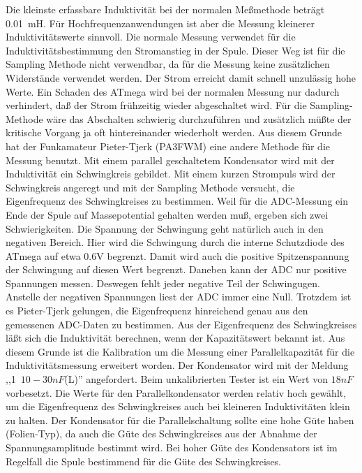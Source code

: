 Die kleinste erfassbare Induktivität bei der normalen Meßmethode beträgt 0.01~mH.
Für Hochfrequenzanwendungen ist aber die Messung kleinerer Induktivitätswerte sinnvoll.
Die normale Messung verwendet für die Induktivitätsbestimmung den Stromanstieg in der Spule.
Dieser Weg ist für die Sampling Methode nicht verwendbar, da für die Messung keine 
zusätzlichen Widerstände verwendet werden. Der Strom erreicht damit schnell unzulässig hohe
Werte. Ein Schaden des ATmega wird bei der normalen Messung nur dadurch verhindert, daß
der Strom frühzeitig wieder abgeschaltet wird. Für die Sampling-Methode wäre das Abschalten
schwierig durchzuführen und zusätzlich müßte der kritische Vorgang ja oft hintereinander wiederholt werden.
Aus diesem Grunde hat der Funkamateur Pieter-Tjerk (PA3FWM) eine andere Methode für die
Messung benutzt. Mit einem parallel geschaltetem Kondensator wird mit der Induktivität ein
Schwingkreis gebildet. Mit einem kurzen Strompuls wird der Schwingkreis angeregt und mit
der Sampling Methode versucht, die Eigenfrequenz des Schwingkreises zu bestimmen.
Weil für die ADC-Messung ein Ende der Spule auf Massepotential gehalten werden muß,
ergeben sich zwei Schwierigkeiten. Die Spannung der Schwingung geht natürlich auch
in den negativen Bereich. Hier wird die Schwingung durch die interne Schutzdiode
des ATmega auf etwa 0.6V begrenzt. Damit wird auch die positive Spitzenspannung der
Schwingung auf diesen Wert begrenzt. Daneben kann der ADC nur positive Spannungen messen.
Deswegen fehlt jeder negative Teil der Schwingugen. Anstelle der negativen Spannungen
liest der ADC immer eine Null.
Trotzdem ist es Pieter-Tjerk gelungen, die Eigenfrequenz hinreichend genau aus den
gemessenen ADC-Daten zu bestimmen. Aus der Eigenfrequenz des Schwingkreises läßt sich
die Induktivität berechnen, wenn der Kapazitätswert bekannt ist.
Aus diesem Grunde ist die Kalibration um die Messung einer Parallelkapazität für
die Induktivitätsmessung erweitert worden.
Der Kondensator wird mit der Meldung ,,\mbox{1  \(10-30nF\)(L)}''
angefordert. Beim unkalibrierten Tester ist ein Wert von \(18nF\) vorbesetzt.
Die Werte für den Parallelkondensator werden relativ hoch gewählt, um die Eigenfrequenz
des Schwingkreises auch bei kleineren Induktivitäten klein zu halten.
Der Kondensator für die Parallelschaltung sollte eine hohe Güte haben (Folien-Typ),
da auch die Güte des Schwingkreises aus der Abnahme der Spannungsamplitude bestimmt wird.
Bei hoher Güte des Kondensators ist im Regelfall die Spule bestimmend für die Güte des
Schwingkreises.


